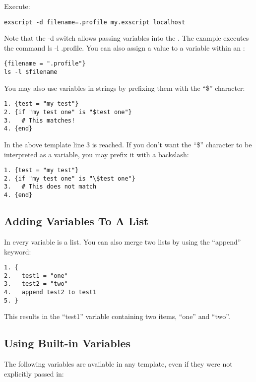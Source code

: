 Execute:

\begin{lstlisting}
exscript -d filename=.profile my.exscript localhost 
\end{lstlisting}

Note that the -d switch allows passing variables into the \product. The 
example executes the command ls -l .profile. 
You can also assign a value to a variable within an \product: 

\begin{lstlisting}
{filename = ".profile"}
ls -l $filename
\end{lstlisting}

You may also use variables in strings by prefixing them with the ``\$'' 
character: 

\begin{lstlisting}
1. {test = "my test"}
2. {if "my test one" is "$test one"}
3.   # This matches!
4. {end}
\end{lstlisting}

In the above template line 3 is reached. If you don't want the ``\$'' 
character to be interpreted as a variable, you may prefix it with a 
backslash: 

\begin{lstlisting}
1. {test = "my test"}
2. {if "my test one" is "\$test one"}
3.   # This does not match
4. {end}
\end{lstlisting}

\subsection{Adding Variables To A List}

In \product every variable is a list. You can also merge two lists by 
using the ``append'' keyword: 

\begin{lstlisting}
1. {
2.   test1 = "one"
3.   test2 = "two"
4.   append test2 to test1
5. }
\end{lstlisting}

This results in the ``test1'' variable containing two items, ``one'' and 
``two''.

\subsection{Using Built-in Variables}

The following variables are available in any \product template, even if 
they were not explicitly passed in:

